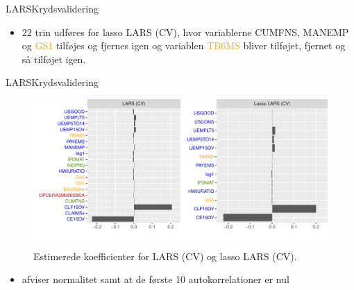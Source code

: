 \begin{frame}{LARS}{Krydsvalidering}
\begin{table}
\center
{}
\caption{Værdien af $f_{\min}$ og $f_{1\text{sd}}$, gennemsnitlig krydsvalideringsfejl, som er målt i MSE, antallet af parametre, justeret R$^2$ og log-likelihood for LARS og lasso LARS. De valgte tuning parametre er markeret med tykt.} \label{tab:lars_lasso_tab}
\end{table}
\begin{itemize}
\item 22 trin udføres for lasso LARS (CV), hvor variablerne \textcolor{chartreuse4}{CUMFNS}, \textcolor{blue3}{MANEMP} og \textcolor{orange}{GS1} tilføjes og fjernes igen og 
variablen \textcolor{orange}{TB6MS} bliver tilføjet, fjernet og så tilføjet igen.  
\end{itemize}
\end{frame}

\begin{frame}{LARS}{Krydsvalidering}
\begin{figure}
\includegraphics[width=1\linewidth, height=0.7\textheight]{slides/coef_lars_kryds.pdf}
\caption{Estimerede koefficienter for LARS (CV) og lasso LARS (CV).}
\end{figure}
\begin{itemize}
\item afviser normalitet samt at de første 10 autokorrelationer er nul
\end{itemize}
\end{frame}

